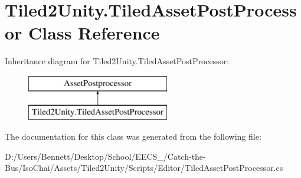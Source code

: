 \hypertarget{class_tiled2_unity_1_1_tiled_asset_post_processor}{}\section{Tiled2\+Unity.\+Tiled\+Asset\+Post\+Processor Class Reference}
\label{class_tiled2_unity_1_1_tiled_asset_post_processor}
Inheritance diagram for Tiled2\+Unity.\+Tiled\+Asset\+Post\+Processor\+:\begin{figure}[H]
\begin{center}
\leavevmode
\includegraphics[height=2.000000cm]{class_tiled2_unity_1_1_tiled_asset_post_processor}
\end{center}
\end{figure}


The documentation for this class was generated from the following file\+:\begin{DoxyCompactItemize}
\item 
D\+:/\+Users/\+Bennett/\+Desktop/\+School/\+E\+E\+C\+S\+\_/\+Catch-\/the-\/\+Bus/\+Iso\+Chai/\+Assets/\+Tiled2\+Unity/\+Scripts/\+Editor/Tiled\+Asset\+Post\+Processor.\+cs\end{DoxyCompactItemize}

